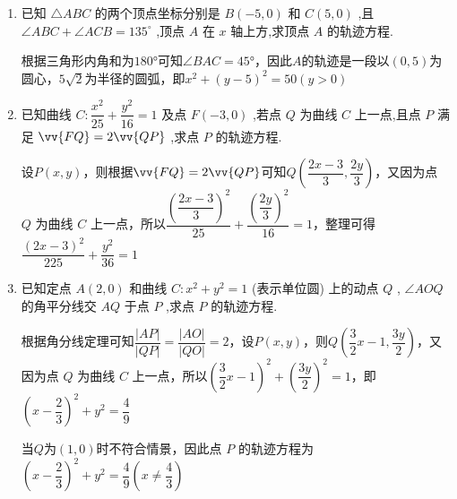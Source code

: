 \begin{enumerate}
    \item 已知 $\bigtriangleup  {ABC}$ 的两个顶点坐标分别是 $B\left( {-5,0}\right)$ 和 $C\left( {5,0}\right)$ ,且 $\angle {ABC} + \angle {ACB} = {135}^{ \circ  }$ ,顶点 $A$ 在 $x$ 轴上方,求顶点 $A$ 的轨迹方程.
    \begin{jieda}
        根据三角形内角和为$\ang{180}$可知$\angle{BAC} = \ang{45}$，因此$A$的轨迹是一段以$(0, 5)$为圆心，$5\sqrt{2}$为半径的圆弧，即$x^2+(y-5)^2 = 50(y>0)$
    \end{jieda}

    \item 已知曲线 ${C} : \dfrac{{x}^{2}}{25} + \dfrac{{y}^{2}}{16} = 1$ 及点 $F\left( {-3,0}\right)$ ,若点 $Q$ 为曲线 ${C}$ 上一点,且点 $P$ 满足 $\vv{FQ} = 2\vv{QP}$ ,求点 $P$ 的轨迹方程.
    \begin{jieda}
        设$P(x, y)$，则根据$\vv{FQ} = 2\vv{QP}$可知$Q\left(\dfrac{2x-3}{3}, \dfrac{2y}{3}\right)$，又因为点 $Q$ 为曲线 ${C}$ 上一点，所以$\dfrac{\left(\dfrac{2x-3}{3}\right)^{2}}{25} + \dfrac{\left(\dfrac{2y}{3}\right)^{2}}{16} = 1$，整理可得$\dfrac{{\left( 2x - 3\right) }^{2}}{225} + \dfrac{{y}^{2}}{36} = 1$
    \end{jieda}

    \item 已知定点 $A\left( {2,0}\right)$ 和曲线 ${C} : {x}^{2} + {y}^{2} = 1$ (表示单位圆) 上的动点 $Q$ , $\angle {AOQ}$ 的角平分线交 ${AQ}$ 于点 $P$ ,求点 $P$ 的轨迹方程.
    \begin{jieda}
        根据角分线定理可知$\dfrac{|AP|}{|QP|} = \dfrac{|AO|}{|QO|} = 2$，设$P(x, y)$，则$Q\left(\dfrac{3}{2}x-1, \dfrac{3y}{2}\right)$，又因为点 $Q$ 为曲线 ${C}$ 上一点，所以$\left(\dfrac{3}{2}x-1\right)^2+\left(\dfrac{3y}{2}\right)^2=1$，即$\left(x-\dfrac{2}{3}\right)^2+y^2 = \dfrac{4}{9}$

        当$Q$为$(1, 0)$时不符合情景，因此点 $P$ 的轨迹方程为$\left(x-\dfrac{2}{3}\right)^2+y^2 = \dfrac{4}{9} \left(x \neq \dfrac{4}{3}\right)$
    \end{jieda}
\end{enumerate}

